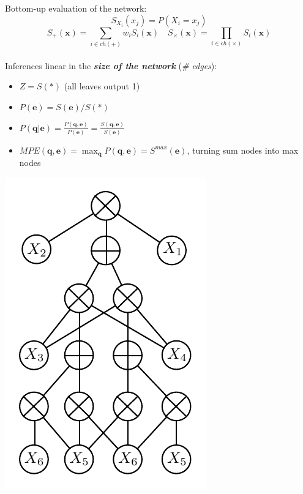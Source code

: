 \documentclass[final]{beamer}
\begin{document}
\begin{frame}{}
\begin{textblock}{25.7}
\begin{minipage}{0.7\linewidth}
    Bottom-up evaluation of the network:
    $$S_{X_i}(x_j)=P(X_i=x_j)$$    
    $$S_{+}(\mathbf{x})=\sum\limits_{i\in
      ch(+)}w_{i}S_{i}(\mathbf{x})\quad S_{\times}(\mathbf{x})=\prod\limits_{i\in
      ch(\times)}S_{i}(\mathbf{x})$$\\[10pt]
    \setlength{\leftmargini}{30pt}
    Inferences linear in the \emph{\textbf{size of the network}} (\emph{\# edges}):
    \begin{itemize}
    \item $Z = S(*)$ (all leaves output 1)
    \item $P(\mathbf{e}) = S(\mathbf{e})/S(*)$
    \item $P(\mathbf{q}| \mathbf{e}) = \frac{P(\mathbf{q},
        \mathbf{e})}{P(\mathbf{e})} = \frac{S(\mathbf{q},
        \mathbf{e})}{S(\mathbf{e})}$
    \item $MPE(\mathbf{q},\mathbf{e}) = \max_{\mathbf{q}}P(\mathbf{q},
      \mathbf{e}) = S^{max}(\mathbf{e})$, turning sum nodes into max nodes
    \end{itemize}
  \end{minipage}\begin{minipage}{0.28\linewidth}
    \includegraphics[width=0.8\linewidth]{figures/spn-long}
  \end{minipage}\\[20pt]


\end{textblock}
\end{frame}
\end{document}

